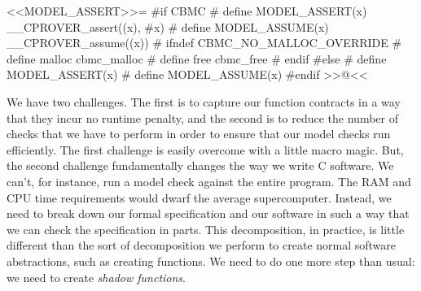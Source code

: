<<MODEL_ASSERT>>=
#if CBMC
# define MODEL_ASSERT(x)  __CPROVER_assert((x), #x)
# define MODEL_ASSUME(x)  __CPROVER_assume((x))
# ifndef CBMC_NO_MALLOC_OVERRIDE
# define malloc cbmc_malloc
# define free cbmc_free
# endif
#else
# define MODEL_ASSERT(x)
# define MODEL_ASSUME(x)
#endif
>>@<<

We have two challenges.  The first is to capture our function contracts in a way
that they incur no runtime penalty, and the second is to reduce the number of
checks that we have to perform in order to ensure that our model checks run
efficiently.  The first challenge is easily overcome with a little macro magic.
But, the second challenge fundamentally changes the way we write C software. We
can't, for instance, run a model check against the entire program.  The RAM and
CPU time requirements would dwarf the average supercomputer.  Instead, we need
to break down our formal specification and our software in such a way that we
can check the specification in parts.  This decomposition, in practice, is
little different than the sort of decomposition we perform to create normal
software abstractions, such as creating functions.  We need to do one more step
than usual: we need to create \emph{shadow functions}.

